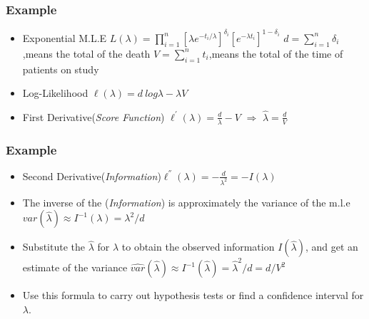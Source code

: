 \documentclass{beamer}
\newcommand{\empr}[1]{{\emph{\color{red}#1}}}
\begin{document}
\pagebreak
\begin{frame}
\frametitle{Example}
\begin{itemize}	
\item Exponential M.L.E	\linebreak $L(\lambda) =  \prod\limits_{i=1}^{n}[\lambda e^{-t_i /\lambda}]^{\delta_i}[e^{-\lambda t_i}]^{1-\delta_i} $ \linebreak
$d = \sum\limits_{i=1}^{n}\delta_i$,means the total of the death\linebreak
$V = \sum\limits_{i=1}^{n}t_i$,means the total of the time of patients on study
\end{itemize}
\begin{itemize}
\item Log-Likelihood\linebreak	
 $\ell(\lambda) = d\ log\lambda - \lambda V$
\end{itemize}
\begin{itemize}	
\item First Derivative(\empr{Score Function})\linebreak
$\ell^{'}(\lambda) = \frac{d}{\lambda} -  V$ $\Rightarrow$ $\hat{\lambda} = \frac{d}{V}$
\end{itemize}
\end{frame}

\pagebreak
\begin{frame}
\frametitle{Example}
\begin{itemize}	
\item Second Derivative(\empr{Information})\linebreak$\ell^{''}(\lambda) = -\frac{d}{\lambda^{2}} = -I(\lambda)$
\end{itemize}
\begin{itemize}	
\item The inverse of the (\empr{Information}) is approximately the variance of the m.l.e \linebreak$var(\hat{\lambda})\approx I^{-1}(\lambda)= \lambda^{2}/d$
\end{itemize}
\begin{itemize}	
\item Substitute the $\hat{\lambda}$ for $\lambda$ to obtain the observed information $I(\hat{\lambda})$, and get an estimate of the variance \linebreak
$\hat{var}(\hat{\lambda})\approx I^{-1}(\hat{\lambda})= \hat{\lambda}^{2}/d=d/V^{2}$
\end{itemize}
\begin{itemize}	
\item Use this formula to carry out hypothesis tests or find a confidence interval for $\lambda$.
\end{itemize}
\end{frame}
\end{document}

